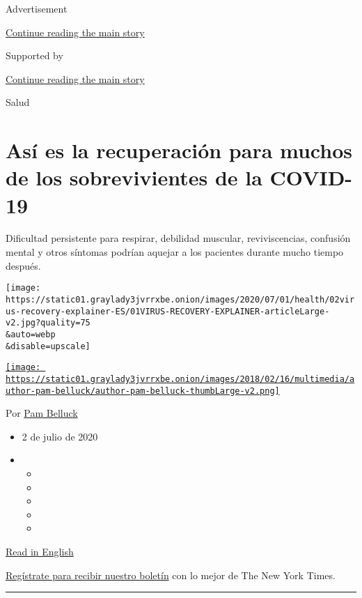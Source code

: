 Advertisement

\protect\hyperlink{after-top}{Continue reading the main story}

Supported by

\protect\hyperlink{after-sponsor}{Continue reading the main story}

Salud

\hypertarget{asuxed-es-la-recuperaciuxf3n-para-muchos-de-los-sobrevivientes-de-la-covid-19}{%
\section{Así es la recuperación para muchos de los sobrevivientes de la
COVID-19}\label{asuxed-es-la-recuperaciuxf3n-para-muchos-de-los-sobrevivientes-de-la-covid-19}}

Dificultad persistente para respirar, debilidad muscular,
reviviscencias, confusión mental y otros síntomas podrían aquejar a los
pacientes durante mucho tiempo después.

\texttt{[image: https://static01.graylady3jvrrxbe.onion/images/2020/07/01/health/02virus-recovery-explainer-ES/01VIRUS-RECOVERY-EXPLAINER-articleLarge-v2.jpg?quality=75\\\&auto=webp\\\&disable=upscale]}

\href{https://www.nytimes3xbfgragh.onion/by/pam-belluck}{\texttt{[image: https://static01.graylady3jvrrxbe.onion/images/2018/02/16/multimedia/author-pam-belluck/author-pam-belluck-thumbLarge-v2.png]}}

Por \href{https://www.nytimes3xbfgragh.onion/by/pam-belluck}{Pam
Belluck}

\begin{itemize}
\item
  2 de julio de 2020
\item
  \begin{itemize}
  \item
  \item
  \item
  \item
  \item
  \end{itemize}
\end{itemize}

\href{https://www.nytimes3xbfgragh.onion/2020/07/01/health/coronavirus-recovery-survivors.html}{Read
in English}

\href{https://www.nytimes3xbfgragh.onion/newsletters/el-times}{Regístrate
para recibir nuestro boletín} con lo mejor de The New York Times.

\begin{center}\rule{0.5\linewidth}{\linethickness}\end{center}

